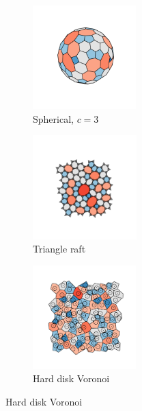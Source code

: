 \begin{figure}[bt]
     \vspace{0.2cm}
      \begin{subfigure}[b]{0.25\textwidth}
         \centering
         \includegraphics[height=4cm]{./figures/general_networks/afull92.pdf}
         \caption{Spherical, $c=3$}
         \label{fig:ne4}
     \end{subfigure}
     \hfill
     \begin{subfigure}[b]{0.25\textwidth}
         \centering
         \includegraphics[height=4cm]{./figures/general_networks/traft.pdf}
         \caption{Triangle raft}
         \label{fig:ne5}
     \end{subfigure}
     \hfill
     \begin{subfigure}[b]{0.25\textwidth}
         \centering
         \includegraphics[height=4cm]{./figures/general_networks/colloid.pdf}
         \caption{Hard disk Voronoi}
         \label{fig:ne6}
     \end{subfigure}
     \hfill
     

\end{figure}
